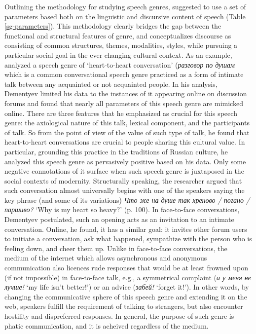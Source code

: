 \documentclass[12pt]{article}
\begin{document}
Outlining the methodology for studying speech genres, \textcite{dementyev2015} suggested to use a set of parameters based both on the linguistic and discursive content of speech (Table \ref{sg-parameters}). This methodology clearly bridges the gap between the functional and structural features of genre, and conceptualizes discourse as consisting of common structures, themes, modalities, styles, while pursuing a particular social goal in the ever-changing cultural context. As an example, \textcite{dementyev2015} analyzed a speech genre of `heart-to-heart conversation' (\foreignlanguage{russian}{\textit{разговор по душам}} which is a common conversational speech genre practiced as a form of intimate talk between any acquainted or not acquainted people. In his analysis, Dementyev limited his data to the instances of it appearing online on discussion forums and found that nearly all parameters of this speech genre are mimicked online. There are three features that he emphasized as crucial for this speech genre: the axiological nature of this talk, lexical component, and the participants of talk. So from the point of view of the value of such type of talk, he found that heart-to-heart conversations are crucial to people sharing this cultural value. In particular, grounding this practice in the traditions of Russian culture, he analyzed this speech genre as pervasively positive based on his data. Only some negative connotations of it surface when such speech genre is juxtaposed in the social contexts of modernity. Structurally speaking, the researcher argued that such conversation almost universally begins with one of the speakers saying the key phrase (and some of its variations) \foreignlanguage{russian}{\textit{Что же на душе так хреново / погано / паршиво?}} `Why is my heart so heavy?' (p. 100). In face-to-face conversations, Dementyev postulated, such an opening acts as an invitation to an intimate conversation. Online, he found, it has a similar goal: it invites other forum users to initiate a conversation, ask what happened, sympathize with the person who is feeling down, and cheer them up. Unlike in face-to-face conversations, the medium of the internet which allows asynchronous and anonymous communication also licences rude responses that would be at least frowned upon (if not impossible) in face-to-face talk, e.g., a symmetrical complaint (\foreignlanguage{russian}{\textit{а у меня не лучше!} `my life isn't better!'}) or an advice (\foreignlanguage{russian}{\textit{забей!}} `forget it!'). In other words, by changing the communicative sphere of this speech genre and extending it on the web, speakers fulfill the requirement of talking to strangers, but also encounter hostility and dispreferred responses. In general, the purpose of such genre is phatic communication, and it is acheived regardless of the medium.
\end{document}
